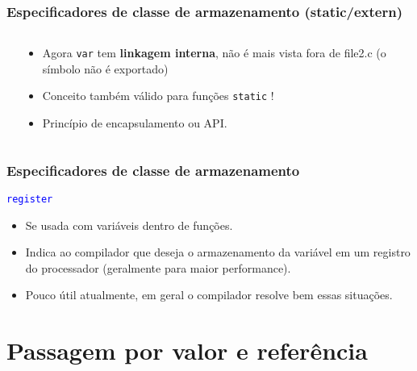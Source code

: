 \documentclass{beamer}
\begin{document}
\begin{frame}
	\frametitle{Especificadores de classe de armazenamento (static/extern)}
	\begin{columns}[T] %
		\begin{column}{.57\textwidth}
			
			
			
		\end{column}%
		\hfill%
		\begin{column}{.43\textwidth}
			\begin{itemize}
				\item Agora \texttt{var} tem \textbf{linkagem interna}, não é mais vista fora de file2.c (o símbolo não é exportado)
				\item Conceito também válido para funções \texttt{static} !
				\item Princípio de encapsulamento ou API.
			\end{itemize}
		\end{column}%
	\end{columns}
\end{frame}

\begin{frame}
	\frametitle{Especificadores de classe de armazenamento}
	\begin{center}
		\texttt{\textcolor{blue}{register}}
	\end{center}
	\vspace*{0.5cm}
	\begin{itemize}
		\item Se usada com variáveis dentro de funções.
		\item Indica ao compilador que deseja o armazenamento da variável em um registro do processador (geralmente para maior performance).
		\item Pouco útil atualmente, em geral o compilador resolve bem essas situações.
	\end{itemize}
\end{frame}

\section{Passagem por valor e referência}
\end{document}
